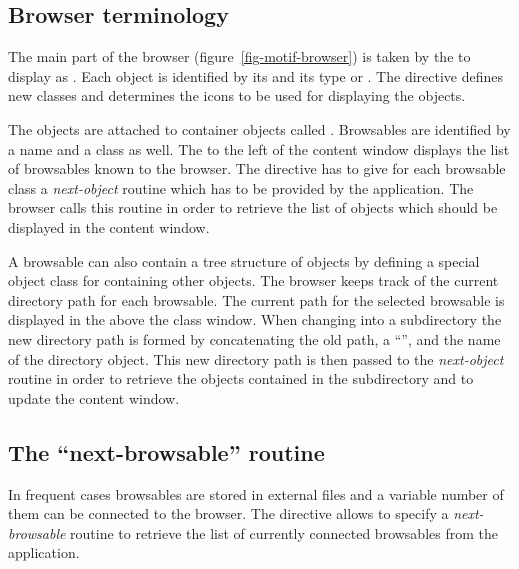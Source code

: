 \subsection{Browser terminology}

The main part of the browser (figure~\ref{fig-motif-browser})
is taken by the  to display  as 
.
Each object is identified by its  and its type or .
The  directive defines new classes and determines the
icons to be used for displaying the objects.

The objects are attached to container objects called .
Browsables are identified by a name and a class as well.
The  to the left of the content window displays the
list of browsables known to the browser.
The  directive has to give for each browsable class a 
\textsl{next-object} routine which has to be provided by the application.
The browser calls this routine in order to retrieve the list of
objects which should be displayed in the content window.

A browsable can also contain a tree structure of objects by defining a
special object class for  containing other objects.
The browser keeps track of the current directory path for each
browsable.
The current path for the selected browsable is displayed in the 
 above the class window.
When changing into a subdirectory the new directory path is formed by
concatenating the old path, a ``\Lit{/}'', and the name of the
directory object.
This new directory path is then passed to the \textsl{next-object}
routine in order to retrieve the objects contained in the
subdirectory and to update the content window.

\subsection{The ``next-browsable'' routine}

In frequent cases browsables are stored in external files and a
variable number of them can be connected to the browser.
The  directive allows to specify a \textsl{next-browsable}
routine to retrieve the list of currently connected browsables from the
application.

